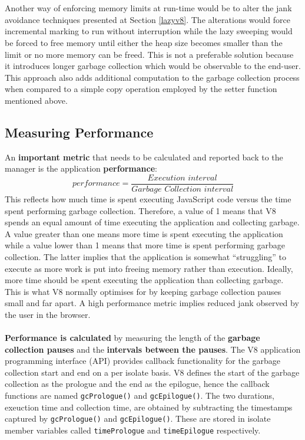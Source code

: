 \documentclass{l4proj}
\begin{document}
\\\\
\hspace*{3em} Another way of enforcing memory limits at run-time would be to alter the jank avoidance techniques presented at Section \ref{lazyv8}. The alterations would force incremental marking to run without interruption while the lazy sweeping would be forced to free memory until either the heap size becomes smaller than the limit or no more memory can be freed. This is not a preferable solution because it introduces longer garbage collection which would be observable to the end-user. This approach also adds additional computation to the garbage collection process when compared to a simple copy operation employed by the setter function mentioned above.
\subsection{Measuring Performance}
\hspace*{3em} An \textbf{important metric} that needs to be calculated and reported back to the manager is the application \textbf{performance}:
\begin{equation}
performance = \frac{\textit{Execution interval}}{\textit{Garbage Collection interval}}
\end{equation}
\hspace*{3em} This reflects how much time is spent executing JavaScript code versus the time spent performing garbage collection. Therefore, a value of 1 means that V8 spends an equal amount of time executing the application and collecting garbage. A value greater than one means more time is spent executing the application while a value lower than 1 means that more time is spent performing garbage collection. The latter implies that the application is somewhat ``struggling'' to execute as more work is put into freeing memory rather than execution. Ideally, more time should be spent executing the application than collecting garbage. This is what V8 normally optimises for by keeping garbage collection pauses small and far apart. A high performance metric implies reduced jank observed by the user in the browser.
\\\\
\hspace*{3em} \textbf{Performance is calculated} by measuring the length of the \textbf{garbage collection pauses} and the \textbf{intervals between the pauses}. The V8 application programming interface (API) provides callback functionality for the garbage collection start and end on a per isolate basis. V8 defines the start of the garbage collection as the prologue and the end as the epilogue, hence the callback functions are named \texttt{gcPrologue()} and \texttt{gcEpilogue()}. The two durations, exeuction time and collection time, are obtained by subtracting the timestamps captured by \texttt{gcPrologue()} and \texttt{gcEpilogue()}. These are stored in isolate member variables called \texttt{timePrologue} and \texttt{timeEpilogue} respectively. 
\end{document}
